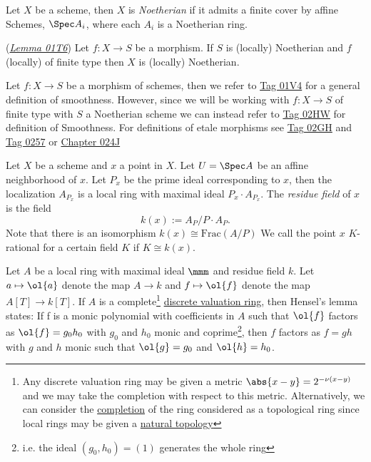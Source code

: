 \documentclass[12pt]{article}
\numberwithin{equation}{section}
\numberwithin{lemma}{section}
\numberwithin{theorem}{section}
\numberwithin{proposition}{section}
\numberwithin{corollary}{section}
\numberwithin{definition}{section}
\numberwithin{example}{section}
\numberwithin{remark}{section}
\begin{document}
\begin{definition}
  Let $X$ be a scheme, then $X$ is \emph{Noetherian} if it admits a
  finite cover by affine Schemes, $\Spec A_i$, where each $A_i$ is a
  Noetherian ring.
\end{definition}

\begin{lemma}{(\emph{\href{https://stacks.math.columbia.edu/tag/01T6}{Lemma
        01T6}})}
  Let $f : X \to S$ be a morphism. If $S$ is (locally) Noetherian and
  $f$ (locally) of finite type then $X$ is (locally) Noetherian.
\end{lemma}

Let $f : X \to S$ be a morphism of schemes, then we refer to
\href{https://stacks.math.columbia.edu/tag/01V4}{Tag 01V4} for a
general definition of smoothness. However, since we will be working
with $f : X \to S$ of finite type with $S$ a Noetherian scheme we can
instead refer to \href{https://stacks.math.columbia.edu/tag/02HW}{Tag
  02HW} for definition of Smoothness. For definitions of etale
morphisms see \href{https://stacks.math.columbia.edu/tag/02GH}{Tag
  02GH} and \href{https://stacks.math.columbia.edu/tag/0257}{Tag 0257}
or \href{https://stacks.math.columbia.edu/tag/024J}{Chapter 024J}

\begin{definition}
  Let $X$ be a scheme and $x$ a point in $X$. Let $U = \Spec A$ be an
  affine neighborhood of $x$. Let $P_x$ be the prime ideal
  corresponding to $x$, then the localization $A_{P_x}$ is a local
  ring with maximal ideal $P_x \cdot A_{P_x}$. The \emph{residue
    field} of $x$ is the field
  \begin{equation*}
    k(x) := A_{P}/P \cdot A_{P}.
  \end{equation*}
  Note that there is an isomorphism $k(x) \cong \text{Frac}(A/P)$
  We call the point $x$ $K$-rational for a certain field $K$ if
  $K \cong k(x)$.
\end{definition}

Let $A$ be a local ring with maximal ideal $\mmm$ and residue field
$k$. Let $a \mapsto \ol{a}$ denote the map $A \to k$ and
$f \mapsto \ol{f}$ denote the map $A[T] \to k[T]$. If $A$ is a
complete\footnote{Any discrete valuation ring may be given a metric
  $\abs{x - y} = 2^{-\nu(x - y)}$ and we may take the completion with
  respect to this metric. Alternatively, we can consider the
  \href{https://en.wikipedia.org/wiki/Completion_of_a_ring}{completion}
  of the ring considered as a topological ring since local rings may
  be given a
  \href{https://en.wikipedia.org/wiki/Local_ring\#Some_facts_and_definitions}{natural
    topology}}
\href{https://en.wikipedia.org/wiki/Discrete_valuation_ring}{discrete
  valuation ring}, then Hensel's lemma states: If f is a monic
polynomial with coefficients in $A$ such that $\ol{f}$ factors as
$\ol{f} = g_0h_0$ with $g_0$ and $h_0$ monic and
coprime\footnote{i.e. the ideal $(g_0, h_0) = (1)$ generates the whole
  ring}, then $f$ factors as $f = gh$ with $g$ and $h$ monic such that
$\ol{g} = g_0$ and $\ol{h} = h_0$.
\end{document}
